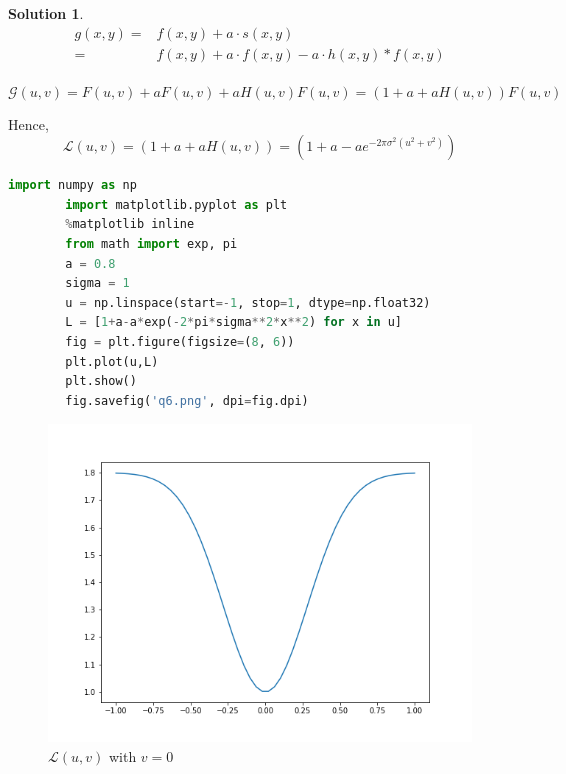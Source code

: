 \documentclass[11pt]{article}
\theoremstyle{plain}
\theoremstyle{definition}
\newtheorem{solution}{Solution}
\theoremstyle{remark}
\begin{document}
\begin{solution}
	\begin{eqnarray*}
		g(x,y) = &f(x,y) + a\cdot s(x,y)\\
		=& f(x,y) + a\cdot f(x,y) - a\cdot h(x,y)*f(x,y)\\
	\end{eqnarray*}
	
	\begin{equation*}
			\mathcal{G}(u,v) = F(u,v) + a F(u,v) + a H(u,v)F(u,v) = (1+a+aH(u,v))F(u,v)
	\end{equation*}
	
	Hence,
	\begin{equation*}
	\mathcal{L}(u,v) =  (1+a+aH(u,v)) = (1+a-ae^{-2\pi \sigma^2(u^2+v^2)})
	\end{equation*}
	
	\begin{lstlisting}[language=Python, caption=Python Implementation of for Q6]
		import numpy as np
		import matplotlib.pyplot as plt
		%matplotlib inline
		from math import exp, pi
		a = 0.8
		sigma = 1
		u = np.linspace(start=-1, stop=1, dtype=np.float32)
		L = [1+a-a*exp(-2*pi*sigma**2*x**2) for x in u]
		fig = plt.figure(figsize=(8, 6))
		plt.plot(u,L)
		plt.show()
		fig.savefig('q6.png', dpi=fig.dpi)
	\end{lstlisting}
	
	\begin{figure}[h]
		\centering
		\includegraphics[width=\textwidth]{q6.png}
		\caption{$\mathcal{L}(u,v)$ with $v=0$}
	\end{figure}
	
\end{solution}
\end{document}
